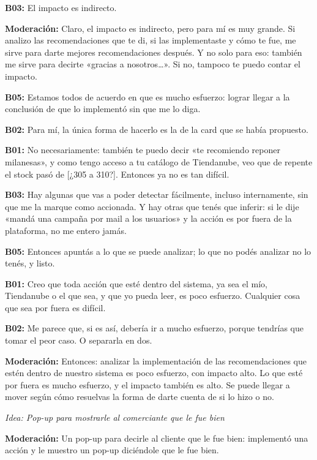 \noindent\textbf{B03:} El impacto es indirecto.

\noindent\textbf{Moderación:} Claro, el impacto es indirecto, pero para mí es muy grande. Si analizo las recomendaciones que te di, si las implementaste y cómo te fue, me sirve para darte mejores recomendaciones después. Y no solo para eso: también me sirve para decirte «gracias a nosotros…». Si no, tampoco te puedo contar el impacto.

\noindent\textbf{B05:} Estamos todos de acuerdo en que es mucho esfuerzo: lograr llegar a la conclusión de que lo implementó sin que me lo diga.

\noindent\textbf{B02:} Para mí, la única forma de hacerlo es la de la card que se había propuesto.

\noindent\textbf{B01:} No necesariamente: también te puedo decir «te recomiendo reponer milanesas», y como tengo acceso a tu catálogo de Tiendanube, veo que de repente el stock pasó de [¿305 a 310?]. Entonces ya no es tan difícil.

\noindent\textbf{B03:} Hay algunas que vas a poder detectar fácilmente, incluso internamente, sin que me la marque como accionada. Y hay otras que tenés que inferir: si le dije «mandá una campaña por mail a los usuarios» y la acción es por fuera de la plataforma, no me entero jamás.

\noindent\textbf{B05:} Entonces apuntás a lo que se puede analizar; lo que no podés analizar no lo tenés, y listo.

\noindent\textbf{B01:} Creo que toda acción que esté dentro del sistema, ya sea el mío, Tiendanube o el que sea, y que yo pueda leer, es poco esfuerzo. Cualquier cosa que sea por fuera es difícil.

\noindent\textbf{B02:} Me parece que, si es así, debería ir a mucho esfuerzo, porque tendrías que tomar el peor caso. O separarla en dos.

\noindent\textbf{Moderación:} Entonces: analizar la implementación de las recomendaciones que estén dentro de nuestro sistema es poco esfuerzo, con impacto alto. Lo que esté por fuera es mucho esfuerzo, y el impacto también es alto. Se puede llegar a mover según cómo resuelvas la forma de darte cuenta de si lo hizo o no.

\medskip\noindent\textit{Idea: Pop-up para mostrarle al comerciante que le fue bien}

\noindent\textbf{Moderación:} Un pop-up para decirle al cliente que le fue bien: implementó una acción y le muestro un pop-up diciéndole que le fue bien.

